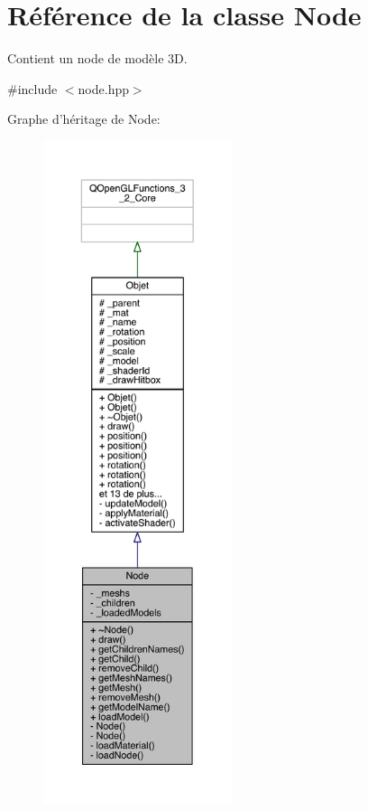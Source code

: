 \hypertarget{class_node}{\section{Référence de la classe Node}
\label{class_node}
}


Contient un node de modèle 3\+D.  




{\ttfamily \#include $<$node.\+hpp$>$}



Graphe d'héritage de Node\+:
\nopagebreak
\begin{figure}[H]
\begin{center}
\leavevmode
\includegraphics[height=550pt]{class_node__inherit__graph}
\end{center}
\end{figure}


